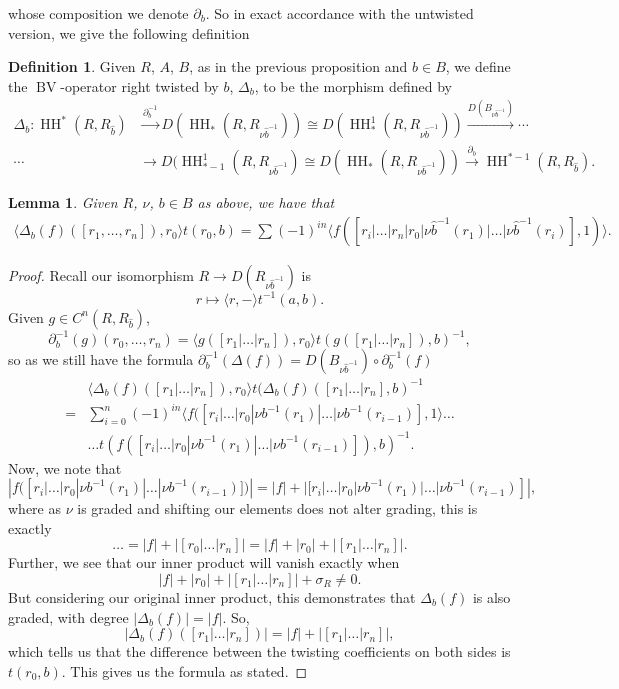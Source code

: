 \documentclass{article}
\newcommand{\HH}{\operatorname{HH}}
\newcommand{\bv}{\operatorname{BV}}
\theoremstyle{plain}
\newtheorem{lemma}[theorem]{Lemma}
\theoremstyle{definition}
\newtheorem{defn}[theorem]{Definition}
\begin{document}
whose composition we denote $\partial_b$. So in exact accordance with the untwisted version, we give the following definition
\begin{defn} Given $R$, $A$, $B$, as in the previous proposition and $b \in B$, we define the $\bv$-operator right twisted by $b$, $\Delta_b$, to be the morphism defined by
$$\begin{aligned}\Delta_b: \HH^*(R,R_{\hat{b}}) &\xrightarrow{\partial_b^{-1}} D(\HH_*(R,R_{\nu\hat{b}^{-1}})) \cong D(\HH_*^1(R,R_{\nu\hat{b}^{-1}})) \xrightarrow{D(B_{\nu\hat{b}^{-1}})} \cdots \\
\cdots &\rightarrow D(\HH_{*-1}^1(R,R_{\nu\hat{b}^{-1}}) \cong D(\HH_*(R,R_{\nu\hat{b}^{-1}})) \xrightarrow{\partial_b} \HH^{*-1}(R,R_{\hat{b}}).
\end{aligned}$$
 \end{defn}
\begin{lemma} Given $R$, $\nu$, $b \in B$ as above, we have that
$$\begin{aligned} \langle \Delta_b(f)([r_1, \ldots, r_n]), r_0 \rangle t(r_0,b) = \sum (-1)^{in}\langle f([r_i | \ldots |r_n | r_0 | \nu\hat{b}^{-1}(r_1) | \ldots | \nu\hat{b}^{-1}(r_i)], 1) \rangle .\end{aligned}$$
\end{lemma}
\begin{proof}
Recall our isomorphism $R \rightarrow D(R_{\nu\hat{b}^{-1}})$ is
$$r \mapsto \langle r , - \rangle t^{-1}(a,b).$$
Given $g \in C^n(R,R_{\hat{b}})$, 
$$\partial_b^{-1}(g)(r_0, \ldots, r_n) = \langle g([r_1 | \ldots | r_n]), r_0 \rangle t(g([r_1 | \ldots | r_n]),b)^{-1},$$
so as we still have the formula $\partial_b^{-1}(\Delta(f)) = D(B_{\nu\hat{b}^{-1}}) \circ \partial_b^{-1}(f)$
$$\begin{aligned}&\langle\Delta_b(f)  ([r_1 | \ldots | r_n]), r_0 \rangle t(\Delta_b(f)([r_1 | \ldots | r_n], b)^{-1} \\ 
=& \sum_{i=0}^n (-1)^{in} \langle f([r_{i} | \ldots |r_0 |\nu b^{-1}(r_1) | \ldots | \nu b^{-1}(r_{i-1})], 1 \rangle \ldots \\
 &  \ldots t(f([r_{i} | \ldots |r_0 |\nu b^{-1}(r_1) | \ldots | \nu b^{-1}(r_{i-1})]), b)^{-1}.
\end{aligned}$$
Now, we note that
$$|f([r_{i} | \ldots |r_0 |\nu b^{-1}(r_1) | \ldots | \nu b^{-1}(r_{i-1})])| = |f| + |[r_{i} | \ldots |r_0 |\nu b^{-1}(r_1) | \ldots | \nu b^{-1}(r_{i-1})]|,$$
where as $\nu$ is graded and shifting our elements does not alter grading, this is exactly
$$\ldots = |f| + |[r_0 | \ldots | r_n]| = |f| + |r_0| + |[r_1 | \ldots | r_n]|.$$
Further, we see that our inner product will vanish exactly when 
$$|f| + |r_0| + |[r_1 | \ldots | r_n]| + \sigma_R \not= 0.$$
But considering our original inner product, this demonstrates that $\Delta_b(f)$ is also graded, with degree $|\Delta_b(f)|=|f|$. So, 
$$|\Delta_b(f)([r_1 | \ldots | r_n])| = |f|+|[r_1 | \ldots | r_n]|,$$
which tells us that the difference between the twisting coefficients on both sides is $t(r_0, b)$. This gives us the formula as stated.
\end{proof}
\end{document}
